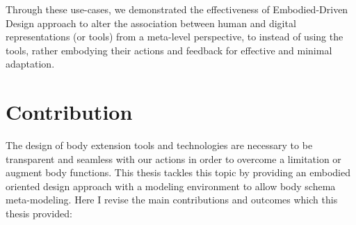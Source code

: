 Through these use-cases, we demonstrated the effectiveness of Embodied-Driven Design approach to alter the association between human and digital representations (or tools) from a meta-level perspective, to instead of using the tools, rather embodying their actions and feedback for effective and minimal adaptation. 




\section{Contribution}

The design of body extension tools and technologies are necessary to be transparent and seamless with our actions in order to overcome a limitation or augment body functions. This thesis tackles this topic by providing an embodied oriented design approach with a modeling environment to allow body schema meta-modeling. Here I revise the main contributions and outcomes which this thesis provided:

